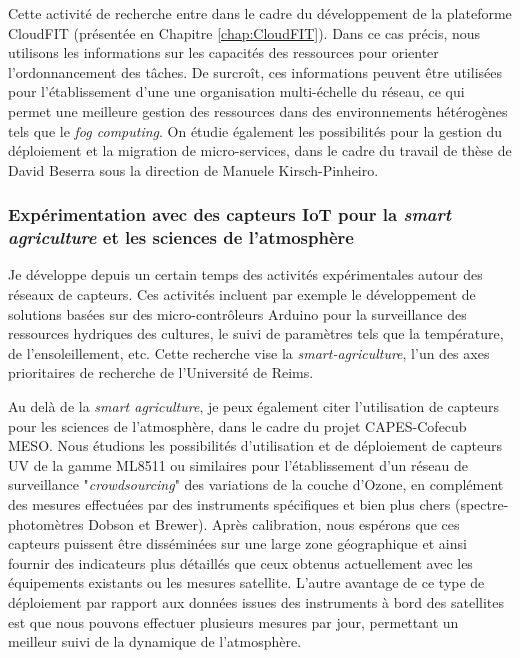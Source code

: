 Cette activité de recherche entre dans le cadre du développement de la plateforme CloudFIT (présentée en Chapitre \ref{chap:CloudFIT}). Dans ce cas précis, nous utilisons les informations sur les capacités des ressources pour orienter l'ordonnancement des tâches. De surcroît, ces informations peuvent être utilisées pour l'établissement d'une une organisation multi-échelle du réseau, ce qui permet une meilleure gestion des ressources dans des environnements hétérogènes tels que le \textit{fog computing}. On étudie également les possibilités pour la gestion du déploiement et la migration de  micro-services, dans le cadre du travail de thèse de David Beserra sous la direction de Manuele Kirsch-Pinheiro. 


\subsubsection*{Expérimentation avec des capteurs IoT pour la \textit{smart agriculture} et les sciences de l'atmosphère}

Je développe depuis un certain temps des activités expérimentales autour des réseaux de capteurs. Ces activités incluent par exemple le développement de solutions basées sur des micro-contrôleurs Arduino pour la surveillance des ressources hydriques des cultures, le suivi de paramètres tels que la température, de l'ensoleillement, etc. Cette recherche vise la \textit{smart-agriculture}, l'un des axes prioritaires de recherche de l'Université de Reims.

Au delà de la \textit{smart agriculture}, je peux également citer l'utilisation de capteurs pour les sciences de l'atmosphère, dans le cadre du projet CAPES-Cofecub MESO. Nous étudions les possibilités d'utilisation et de déploiement de capteurs UV de la gamme ML8511 ou similaires pour l'établissement d'un réseau de surveillance "\textit{crowdsourcing}" des variations de la couche d'Ozone, en complément des mesures effectuées par des instruments spécifiques et bien plus chers (spectre-photomètres Dobson et Brewer). Après calibration, nous espérons que ces capteurs puissent être disséminées sur une large zone géographique et ainsi fournir des indicateurs plus détaillés que ceux obtenus actuellement avec les équipements existants ou les mesures satellite. L'autre avantage de ce type de déploiement par rapport aux données issues des instruments à bord des satellites est que nous pouvons effectuer plusieurs mesures par jour, permettant un meilleur suivi de la dynamique de l'atmosphère.

